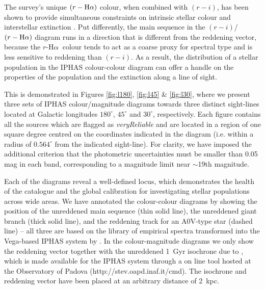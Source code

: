 \documentclass[useAMS,usenatbib]{mn2e}
\def\ha{\mbox{H$\rm \alpha$}}
\begin{document}
The survey's unique $(r-\ha)$ colour,
when combined with $(r-i)$,
has been shown to provide simultaneous constraints 
on intrinsic stellar colour and interstellar extinction \citep{Drew2008}. 
Put differently, the main sequence in the $(r-i)$/$(r-\ha)$ diagram
runs in a direction that is different from the reddening vector,
because the $r$-\ha\ colour tends to act
as a coarse proxy for spectral type
and is less sensitive to reddening than $(r-i)$.
As a result, the distribution of a stellar population
in the IPHAS colour-colour diagram
can offer a handle on the properties of the population
and the extinction along a line of sight.

This is demonstrated 
in Figures \ref{fig:l180}, \ref{fig:l45} \& \ref{fig:l30},
where we present three sets of IPHAS colour/magnitude diagrams
towards three distinct sight-lines
located at Galactic longitudes 
$180^\circ$, $45^\circ$ and $30^\circ$, respectively.
Each figure contains all the sources
which are flagged as \emph{veryReliable}
and are located in a region of one square degree 
centred on the coordinates indicated in the diagram
(i.e. within a radius of $0.564^\circ$ from the indicated sight-line).
For clarity, we have imposed the additional criterion
that the photometric uncertainties
must be smaller than 0.05 mag in each band,
corresponding to a magnitude limit near $\sim$19th magnitude.

Each of the diagrams reveal a well-defined locus,
which demonstrates the health of the catalogue and the global calibration
for investigating stellar populations across wide areas.
We have annotated the colour-colour diagrams
by showing the position 
of the unreddened main sequence (thin solid line),
the unreddened giant branch (thick solid line),
and the reddening track for an A0V-type star (dashed line)
-- all three are based on the \cite{Pickles1998} library 
of empirical spectra
transformed into the Vega-based IPHAS system by \cite{Drew2005}.
In the colour-magnitude diagrams we only show the reddening vector
together with the unreddened 1~Gyr isochrone due to \cite{Bressan2012},
which is made available for the IPHAS system through a
on line tool hosted at the Observatory of Padova
(http://stev.oapd.inaf.it/cmd).
The isochrone and reddening vector have been placed
at an arbitrary distance of 2~kpc.
\end{document}
